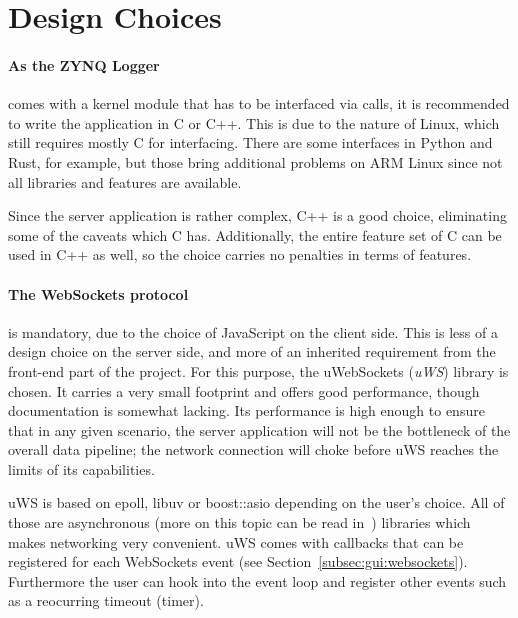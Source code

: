 %
%
\section{Design Choices} %
\label{sec:server:design_choices}

\paragraph{As  the ZYNQ  Logger} comes  with a  kernel module  that has  to be
interfaced via  calls, it  is recommended to write the application
in C or C++. This is due to the nature of Linux, which still requires mostly C
for interfacing. There  are some   interfaces in Python  and Rust,
for example,  but those bring additional  problems on ARM Linux  since not all
libraries and features are available.

Since  the  server application  is  rather  complex,  C++  is a  good  choice,
eliminating some of the caveats  which C has. Additionally, the entire feature
set of  C can be used  in C++ as well,  so the choice carries  no penalties in
terms of features.

\paragraph{The  WebSockets  protocol}  is  mandatory, due  to  the  choice  of
JavaScript on the client side.  This is  less of a design choice on the server
side,  and  more of  an  inherited  requirement  from  the front-end  part  of
the  project. For  this  purpose,  the  uWebSockets  (\emph{uWS})  library  is
chosen.  It carries a very small footprint and offers good performance, though
documentation is  somewhat lacking. Its performance  is high enough  to ensure
that in any given scenario, the  server application will not be the bottleneck
of the  overall data pipeline;  the network  connection will choke  before uWS
reaches the limits of its capabilities.

uWS  is  based  on  epoll,  libuv  or  boost::asio  depending  on  the  user's
choice. All  of  those are  asynchronous  (more  on  this  topic can  be  read
in~\cite{uws:async}) libraries  which makes  networking very  convenient. uWS
comes with  callbacks that  can be  registered for  each WebSockets  event (see
Section~\ref{subsec:gui:websockets}). Furthermore the  user can hook  into the
event loop and register other events such as a reocurring timeout (timer).

